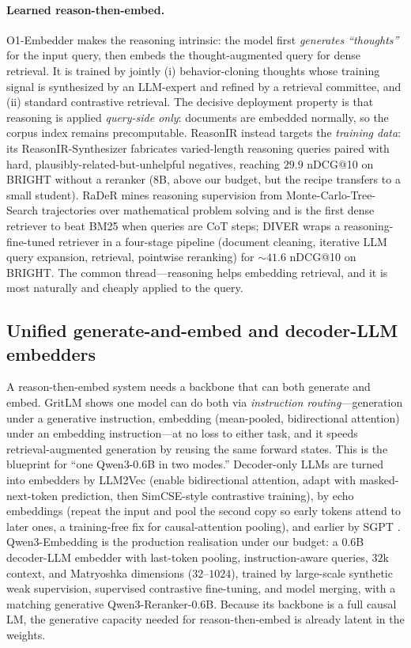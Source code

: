 \paragraph{Learned reason-then-embed.} O1-Embedder \citep{re:yan2025o1embedder} makes
the reasoning intrinsic: the model first \emph{generates ``thoughts''} for the input
query, then embeds the thought-augmented query for dense retrieval. It is trained by
jointly (i) behavior-cloning thoughts whose training signal is synthesized by an
LLM-expert and refined by a retrieval committee, and (ii) standard contrastive
retrieval. The decisive deployment property is that reasoning is applied
\emph{query-side only}: documents are embedded normally, so the corpus index remains
precomputable. ReasonIR \citep{re:shao2025reasonir} instead targets the \emph{training
data}: its ReasonIR-Synthesizer fabricates varied-length reasoning queries paired with
hard, plausibly-related-but-unhelpful negatives, reaching $29.9$ nDCG@10 on BRIGHT
without a reranker (8B, above our budget, but the recipe transfers to a small student).
RaDeR \citep{re:das2025rader} mines reasoning supervision from Monte-Carlo-Tree-Search
trajectories over mathematical problem solving and is the first dense retriever to beat
BM25 when queries are CoT steps; DIVER \citep{re:long2025diver} wraps a
reasoning-fine-tuned retriever in a four-stage pipeline (document cleaning, iterative
LLM query expansion, retrieval, pointwise reranking) for ${\sim}41.6$ nDCG@10 on BRIGHT.
The common thread---reasoning helps embedding retrieval, and it is most naturally and
cheaply applied to the query.

\subsection{Unified generate-and-embed and decoder-LLM embedders}
\label{sec:re:unified}
A reason-then-embed system needs a backbone that can both generate and embed. GritLM
\citep{re:muennighoff2024gritlm} shows one model can do both via \emph{instruction
routing}---generation under a generative instruction, embedding (mean-pooled, bidirectional
attention) under an embedding instruction---at no loss to either task, and it speeds
retrieval-augmented generation by reusing the same forward states. This is the blueprint
for ``one Qwen3-0.6B in two modes.'' Decoder-only LLMs are turned into embedders by
LLM2Vec \citep{re:behnamghader2024llm2vec} (enable bidirectional attention, adapt with
masked-next-token prediction, then SimCSE-style contrastive training), by echo
embeddings \citep{re:springer2024repetition} (repeat the input and pool the second copy
so early tokens attend to later ones, a training-free fix for causal-attention pooling),
and earlier by SGPT \citep{re:muennighoff2022sgpt}. Qwen3-Embedding
\citep{re:zhang2025qwen3emb} is the production realisation under our budget: a 0.6B
decoder-LLM embedder with last-token pooling, instruction-aware queries, $32$k context,
and Matryoshka dimensions ($32$--$1024$), trained by large-scale synthetic weak
supervision, supervised contrastive fine-tuning, and model merging, with a matching
generative Qwen3-Reranker-0.6B. Because its backbone is a full causal LM, the
generative capacity needed for reason-then-embed is already latent in the weights.

